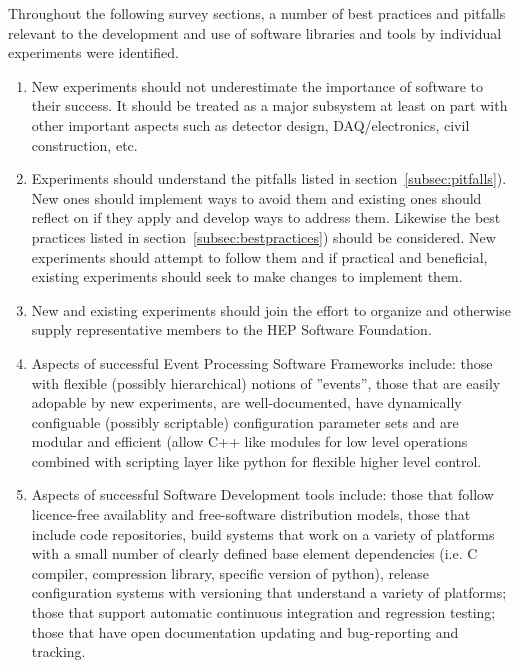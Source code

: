 Throughout the following survey sections, a number of best practices
and pitfalls relevant to the development and use of software libraries
and tools by individual experiments were identified.

\begin{enumerate}

\item New experiments should not underestimate the importance of
  software to their success.  It should be treated as a major
  subsystem at least on part with other important aspects such as
  detector design, DAQ/electronics, civil construction, etc.

\item Experiments should understand the pitfalls listed in
  section~\ref{subsec:pitfalls}).  New ones should implement ways to
  avoid them and existing ones should reflect on if they apply and
  develop ways to address them.  Likewise the best practices listed in
  section~\ref{subsec:bestpractices}) should be considered.  New
  experiments should attempt to follow them and if practical and
  beneficial, existing experiments should seek to make changes to
  implement them.

\item New and existing experiments should join the effort to organize
  and otherwise supply representative members to the HEP Software
  Foundation.

\item Aspects of successful Event Processing Software Frameworks include: 
those with flexible (possibly hierarchical) notions of ''events'', 
those that are easily adopable by new experiments, are well-documented, 
have dynamically configuable (possibly scriptable) configuration 
parameter sets and are modular and efficient (allow C++ like modules 
for low level 
operations combined with scripting layer like python for flexible 
higher level control.

\item Aspects of successful Software Development tools include:
those that follow licence-free availablity and free-software distribution models, those that include code repositories, build systems that work on a variety of platforms with a small number of clearly defined base element dependencies 
(i.e. C compiler, compression library, specific version of python), release 
configuration systems with versioning that understand a variety of 
platforms; those that support automatic continuous integration and 
regression testing; those that have open documentation updating and  
bug-reporting and tracking.


\end{enumerate}
